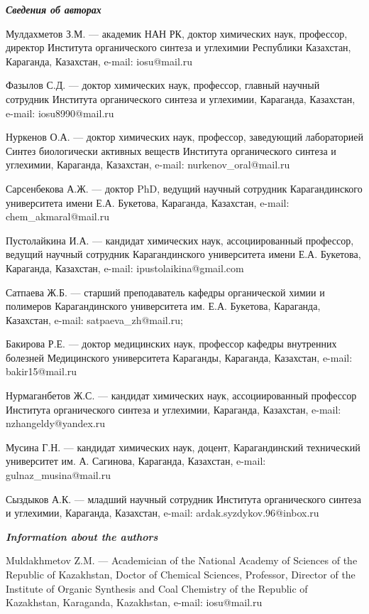 \begin{authorinfo}
\emph{{\bfseries Сведения об авторах}}  

Мулдахметов З.М. — академик НАН РК, доктор химических наук, профессор,
директор Института органического синтеза и углехимии Республики
Казахстан, Караганда, Казахстан, e-mail: iosu@mail.ru

Фазылов С.Д. — доктор химических наук, профессор, главный научный
сотрудник Института органического синтеза и углехимии, Караганда,
Казахстан, e-mail: iosu8990@mail.ru

Нуркенов О.А. — доктор химических наук, профессор, заведующий
лабораторией Синтез биологически активных веществ Института
органического синтеза и углехимии, Караганда, Казахстан, e-mail:
nurkenov\_oral@mail.ru

Сарсенбекова А.Ж. — доктор PhD, ведущий научный сотрудник
Карагандинского университета имени Е.А. Букетова, Караганда,
Казахстан, e-mail: chem\_akmaral@mail.ru

Пустолайкина И.А. — кандидат химических наук, ассоциированный
профессор, ведущий научный сотрудник Карагандинского университета
имени Е.А. Букетова, Караганда, Казахстан, e-mail:
ipustolaikina@gmail.com

Сатпаева Ж.Б. — старший преподаватель кафедры органической химии и
полимеров Карагандинского университета им. Е.А. Букетова, Караганда,
Казахстан, e-mail: satpaeva\_zh@mail.ru;

Бакирова Р.Е. — доктор медицинских наук, профессор кафедры внутренних
болезней Медицинского университета Караганды, Караганда, Казахстан,
e-mail: bakir15@mail.ru

Нурмаганбетов Ж.С. — кандидат химических наук, ассоциированный
профессор Института органического синтеза и углехимии, Караганда,
Казахстан, e-mail: nzhangeldy@yandex.ru

Мусина Г.Н. — кандидат химических наук, доцент, Карагандинский
технический университет им. А. Сагинова, Караганда, Казахстан, e-mail:
gulnaz\_musina@mail.ru

Сыздыков А.К. — младший научный сотрудник Института органического
синтеза и углехимии, Караганда, Казахстан, e-mail:
ardak.syzdykov.96@inbox.ru

\emph{{\bfseries Information about the authors}}  

Muldakhmetov Z.M. — Academician of the National Academy of Sciences of
the Republic of Kazakhstan, Doctor of Chemical Sciences, Professor,
Director of the Institute of Organic Synthesis and Coal Chemistry of
the Republic of Kazakhstan, Karaganda, Kazakhstan, e-mail:
iosu@mail.ru


\end{authorinfo}
